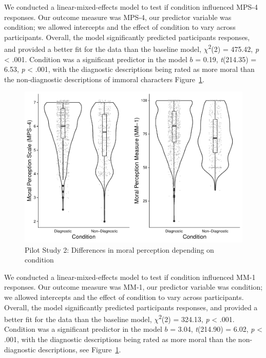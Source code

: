 \documentclass[
  english,
  man,floatsintext]{apa7}
\begin{document}
We conducted a linear-mixed-effects model to test if condition influenced MPS-4 responses. Our outcome measure was MPS-4, our predictor variable was condition; we allowed intercepts and the effect of condition to vary across participants.
Overall, the model significantly predicted participants responses, and provided a better fit for the data than the baseline model, \(\chi\)\textsuperscript{2}(2) = 475.42, \emph{p} \textless{} .001. Condition was a significant predictor in the model \(b\) = 0.19, \emph{t}(214.35) = 6.53, \emph{p} \textless{} .001, with the diagnostic descriptions being rated as more moral than the non-diagnostic descriptions of immoral characters Figure~\ref{fig:pilot2bothconditionplot}.

\begin{figure}
\centering
\includegraphics{moral_dilution_in_chunks_files/figure-latex/pilot2bothconditionplot-1.pdf}
\caption{\label{fig:pilot2bothconditionplot}Pilot Study 2: Differences in moral perception depending on condition}
\end{figure}

We conducted a linear-mixed-effects model to test if condition influenced MM-1 responses. Our outcome measure was MM-1, our predictor variable was condition; we allowed intercepts and the effect of condition to vary across participants. Overall, the model significantly predicted participants responses, and provided a better fit for the data than the baseline model, \(\chi\)\textsuperscript{2}(2) = 324.13, \emph{p} \textless{} .001. Condition was a significant predictor in the model \(b\) = 3.04, \emph{t}(214.90) = 6.02, \emph{p} \textless{} .001, with the diagnostic descriptions being rated as more moral than the non-diagnostic descriptions, see Figure~\ref{fig:pilot2bothconditionplot}.
\end{document}
